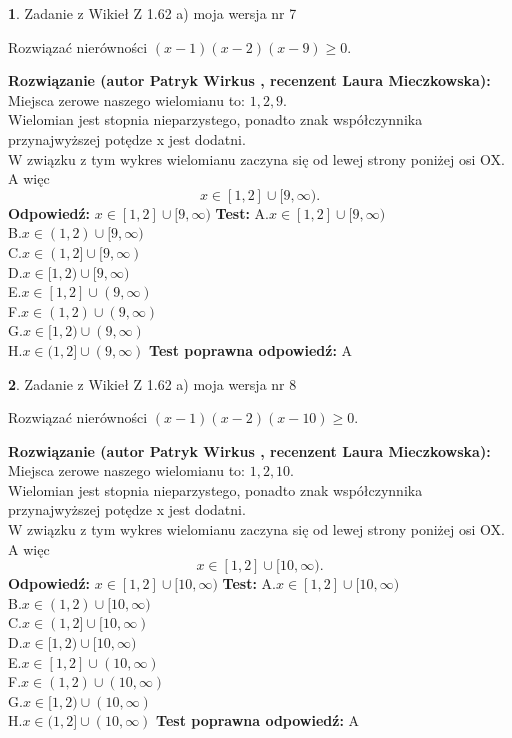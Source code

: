 \documentclass[12pt, a4paper]{article}
\theoremstyle{definition} %
\newtheorem{zad}{}
\newcommand{\zadStart}[1]{\begin{zad}#1\newline}
\newcommand{\zadStop}{\end{zad}}
\newcommand{\rozwStart}[2]{\noindent \textbf{Rozwiązanie (autor #1 , recenzent #2): }\newline}
\newcommand{\rozwStop}{\newline}
\newcommand{\odpStart}{\noindent \textbf{Odpowiedź:}\newline}
\newcommand{\odpStop}{\newline}
\newcommand{\testStart}{\noindent \textbf{Test:}\newline}
\newcommand{\testStop}{\newline}
\newcommand{\kluczStart}{\noindent \textbf{Test poprawna odpowiedź:}\newline}
\newcommand{\kluczStop}{\newline}
\begin{document}
\zadStart{Zadanie z Wikieł Z 1.62 a) moja wersja nr 7}

Rozwiązać nierówności $(x-1)(x-2)(x-9)\ge0$.
\zadStop
\rozwStart{Patryk Wirkus}{Laura Mieczkowska}
Miejsca zerowe naszego wielomianu to: $1, 2, 9$.\\
Wielomian jest stopnia nieparzystego, ponadto znak współczynnika przy\linebreak najwyższej potędze x jest dodatni.\\ W związku z tym wykres wielomianu zaczyna się od lewej strony poniżej osi OX. A więc $$x \in [1,2] \cup [9,\infty).$$
\rozwStop
\odpStart
$x \in [1,2] \cup [9,\infty)$
\odpStop
\testStart
A.$x \in [1,2] \cup [9,\infty)$\\
B.$x \in (1,2) \cup [9,\infty)$\\
C.$x \in (1,2] \cup [9,\infty)$\\
D.$x \in [1,2) \cup [9,\infty)$\\
E.$x \in [1,2] \cup (9,\infty)$\\
F.$x \in (1,2) \cup (9,\infty)$\\
G.$x \in [1,2) \cup (9,\infty)$\\
H.$x \in (1,2] \cup (9,\infty)$
\testStop
\kluczStart
A
\kluczStop



\zadStart{Zadanie z Wikieł Z 1.62 a) moja wersja nr 8}

Rozwiązać nierówności $(x-1)(x-2)(x-10)\ge0$.
\zadStop
\rozwStart{Patryk Wirkus}{Laura Mieczkowska}
Miejsca zerowe naszego wielomianu to: $1, 2, 10$.\\
Wielomian jest stopnia nieparzystego, ponadto znak współczynnika przy\linebreak najwyższej potędze x jest dodatni.\\ W związku z tym wykres wielomianu zaczyna się od lewej strony poniżej osi OX. A więc $$x \in [1,2] \cup [10,\infty).$$
\rozwStop
\odpStart
$x \in [1,2] \cup [10,\infty)$
\odpStop
\testStart
A.$x \in [1,2] \cup [10,\infty)$\\
B.$x \in (1,2) \cup [10,\infty)$\\
C.$x \in (1,2] \cup [10,\infty)$\\
D.$x \in [1,2) \cup [10,\infty)$\\
E.$x \in [1,2] \cup (10,\infty)$\\
F.$x \in (1,2) \cup (10,\infty)$\\
G.$x \in [1,2) \cup (10,\infty)$\\
H.$x \in (1,2] \cup (10,\infty)$
\testStop
\kluczStart
A
\kluczStop
\end{document}
